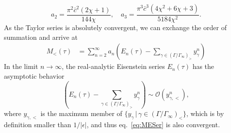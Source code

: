 \documentclass[aps,twocolumn,prl,showpacs,amsmath,amssymb,10pt]{revtex4-2}
\begin{document}
\begin{equation}
    a_2 = \frac{\pi^2\bar{c}^2(2\chi+1)}{144\chi}, \quad a_3 = \frac{\pi ^3 \bar{c}^3 \left(4 \chi ^2+6 \chi +3\right)}{5184 \chi ^2}.
\end{equation}
As the Taylor series is absolutely convergent, we can exchange the order of summation and arrive at
\begin{align}
    M_{<}(\tau) &=\sum_{n=2}^\infty a_n\left(E_n(\tau) - \sum_{\gamma\in(\Gamma/\Gamma_\infty)_>}y_\gamma^n\right)
   \label{eq:MESer}
\end{align}
In the limit $n\rightarrow \infty$, the real-analytic Eisenstein series $E_n(\tau)$ has the asymptotic behavior
\begin{equation}
    \left(E_n(\tau) - \sum_{\gamma\in(\Gamma/\Gamma_\infty)_>}y_\gamma^n\right) \sim \mathcal{O}(y_{\gamma,<}^n),
\end{equation}
where $y_{\gamma,<}$ is the maximum member of $\{y_\gamma \,|\, \gamma\in(\Gamma/\Gamma_\infty)_<\}$, which is by definition smaller than $1/|\epsilon|$, and thus eq.~\eqref{eq:MESer} is also convergent.



\end{document}

